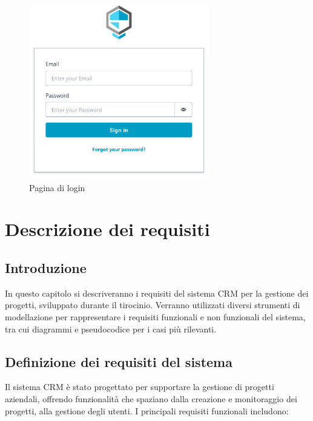 \documentclass[target=bach,aauheader=,style=]{thud}
\begin{document}
\begin{figure}[H]
    \centering
    \includegraphics[width=0.7\textwidth]{img/login.pdf} 
    \caption{Pagina di login}
\end{figure}


\chapter{Descrizione dei requisiti}

\section{Introduzione}
In questo capitolo si descriveranno i requisiti del sistema CRM per la gestione dei progetti, sviluppato durante il tirocinio. Verranno utilizzati diversi strumenti di modellazione per rappresentare i requisiti funzionali e non funzionali del sistema, tra cui diagrammi e pseudocodice per i casi più rilevanti.

\section{Definizione dei requisiti del sistema}
Il sistema CRM è stato progettato per supportare la gestione di progetti aziendali, offrendo funzionalità che spaziano dalla creazione e monitoraggio dei progetti, alla gestione degli utenti. I principali requisiti funzionali includono:
\end{document}
